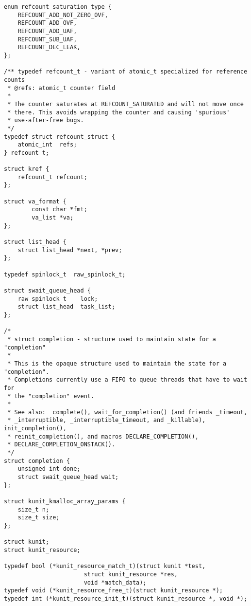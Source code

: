 \documentclass{article}
\begin{document}
\begin{lstlisting}[style=CStyle]
enum refcount_saturation_type {
	REFCOUNT_ADD_NOT_ZERO_OVF,
	REFCOUNT_ADD_OVF,
	REFCOUNT_ADD_UAF,
	REFCOUNT_SUB_UAF,
	REFCOUNT_DEC_LEAK,
};

/** typedef refcount_t - variant of atomic_t specialized for reference counts
 * @refs: atomic_t counter field
 *
 * The counter saturates at REFCOUNT_SATURATED and will not move once
 * there. This avoids wrapping the counter and causing 'spurious'
 * use-after-free bugs.
 */
typedef struct refcount_struct {
	atomic_int  refs;
} refcount_t;

struct kref {
	refcount_t refcount;
};

struct va_format {
        const char *fmt;
        va_list *va;
};

struct list_head {
	struct list_head *next, *prev;
};

typedef spinlock_t  raw_spinlock_t;

struct swait_queue_head {
	raw_spinlock_t	  lock;
	struct list_head  task_list;
};

/*
 * struct completion - structure used to maintain state for a "completion"
 *
 * This is the opaque structure used to maintain the state for a "completion".
 * Completions currently use a FIFO to queue threads that have to wait for
 * the "completion" event.
 *
 * See also:  complete(), wait_for_completion() (and friends _timeout,
 * _interruptible, _interruptible_timeout, and _killable), init_completion(),
 * reinit_completion(), and macros DECLARE_COMPLETION(),
 * DECLARE_COMPLETION_ONSTACK().
 */
struct completion {
	unsigned int done;
	struct swait_queue_head wait;
};

struct kunit_kmalloc_array_params {
	size_t n;
	size_t size;
};

struct kunit;
struct kunit_resource;

typedef bool (*kunit_resource_match_t)(struct kunit *test,
				       struct kunit_resource *res,
				       void *match_data);
typedef void (*kunit_resource_free_t)(struct kunit_resource *);
typedef int (*kunit_resource_init_t)(struct kunit_resource *, void *);


\end{lstlisting}
\end{document}
